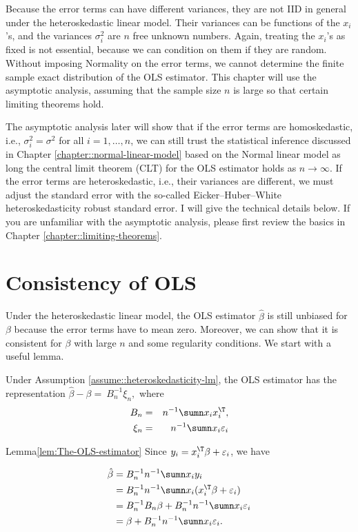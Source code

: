  Because
the error terms can have different variances, they are not IID
in general under the heteroskedastic linear model. Their variances can be functions of the $x_{i}$'s, and
the variances $\sigma_{i}^{2}$ are $n$ free unknown numbers. Again, treating the
$x_{i}$'s as fixed is not essential, because we can condition on
them if they are random. Without imposing Normality on the error terms,
we cannot determine the finite sample exact distribution of the OLS
estimator. This chapter will use the asymptotic analysis,
assuming that the sample size $n$ is large so that certain limiting
theorems hold. 

The asymptotic analysis later will show that if the error terms are
homoskedastic, i.e., $\sigma_{i}^{2}=\sigma^{2}$ for all $i=1,\ldots,n$,
we can still trust the statistical inference discussed in Chapter \ref{chapter::normal-linear-model} based on the Normal
linear model as long the central limit theorem (CLT) for the OLS estimator
holds as $n\rightarrow\infty$. If the error terms are heteroskedastic,
i.e., their variances are different, we must adjust the standard
error with the so-called Eicker--Huber--White heteroskedasticity robust standard error.
I will give the technical details below. 
If you are unfamiliar with the asymptotic analysis, please first review the basics in Chapter \ref{chapter::limiting-theorems}. 


\section{Consistency of OLS}


Under the heteroskedastic linear model,  the OLS estimator $\hat{\beta}$ is still unbiased for $\beta$ because the error terms have to mean zero. Moreover, we can show that it is consistent
for $\beta$ with large $n$ and some regularity conditions. We start
with a useful lemma.
\begin{lemma}
\label{lem:The-OLS-estimator}
Under Assumption \ref{assume::heteroskedasticity-lm}, the OLS estimator has the
representation
$
\hat{\beta}-\beta=\ B_{n}^{-1} \xi_n,
$
where
\begin{eqnarray*}
B_{n} &=& n^{-1}\sumn x_{i}x_{i}^{\T},\\ 
\xi_n &=& n^{-1}\sumn x_{i}\varepsilon_{i}
\end{eqnarray*}
\end{lemma}


\begin{myproof}{Lemma}{\ref{lem:The-OLS-estimator}}
Since $y_{i}=x_{i}^{\T}\beta+\varepsilon_{i}$, we have

\begin{align*}
\hat{\beta} & =B_{n}^{-1}n^{-1}\sumn x_{i}y_{i}\\
 & =B_{n}^{-1}n^{-1}\sumn x_{i}(x_{i}^{\T}\beta+\varepsilon_{i})\\
 & =B_{n}^{-1}B_{n}\beta+B_{n}^{-1}n^{-1}\sumn x_{i}\varepsilon_{i}\\
 & =\beta+ B_{n}^{-1}n^{-1}\sumn x_{i}\varepsilon_{i}.
\end{align*}
\end{myproof}



